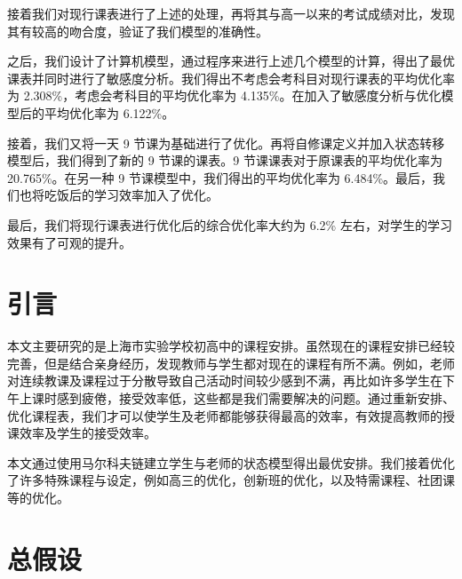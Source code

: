 \documentclass[a4paper]{article}
\begin{document}
 接着我们对现行课表进行了上述的处理，再将其与高一以来的考试成绩对比，发现其有较高的吻合度，验证了我们模型的准确性。

 之后，我们设计了计算机模型，通过程序来进行上述几个模型的计算，得出了最优课表并同时进行了敏感度分析。我们得出不考虑会考科目对现行课表的平均优化率为 2.308\%，考虑会考科目的平均优化率为 4.135\%。在加入了敏感度分析与优化模型后的平均优化率为 6.122\%。

 接着，我们又将一天 9 节课为基础进行了优化。再将自修课定义并加入状态转移模型后，我们得到了新的 9 节课的课表。9 节课课表对于原课表的平均优化率为 20.765\%。在另一种 9 节课模型中，我们得出的平均优化率为 6.484\%。最后，我们也将吃饭后的学习效率加入了优化。

 最后，我们将现行课表进行优化后的综合优化率大约为 6.2\% 左右，对学生的学习效果有了可观的提升。

\clearpage

\tableofcontents
\clearpage

\section{引言}

 本文主要研究的是上海市实验学校初高中的课程安排。虽然现在的课程安排已经较完善，但是结合亲身经历，发现教师与学生都对现在的课程有所不满。例如，老师对连续教课及课程过于分散导致自己活动时间较少感到不满，再比如许多学生在下午上课时感到疲倦，接受效率低，这些都是我们需要解决的问题。通过重新安排、优化课程表，我们才可以使学生及老师都能够获得最高的效率，有效提高教师的授课效率及学生的接受效率。

 本文通过使用马尔科夫链建立学生与老师的状态模型得出最优安排。我们接着优化了许多特殊课程与设定，例如高三的优化，创新班的优化，以及特需课程、社团课等的优化。

\section{总假设}
\end{document}
